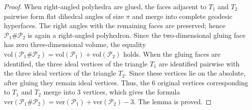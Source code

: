 \documentclass[10pt,a4paper]{amsart}
\newcommand{\ver}{\mathrm{ver}}
\newcommand{\vol}{\mathrm{vol}}
\begin{document}
	\begin{proof}
			When right-angled polyhedra are glued, the faces adjacent to $T_1$ and $T_2$ pairwise form flat dihedral angles of size $\pi$ and merge into complete geodesic hyperfaces. The right angles with the remaining faces are preserved; hence $\mathcal P_1 \# \mathcal P_2$ is again a right-angled polyhedron.
			Since the two-dimensional gluing face has zero three-dimensional volume, the equality $\vol(\mathcal P_1 \# \mathcal P_2) = \vol(\mathcal P_1) + \vol(\mathcal P_2)$ holds. When the gluing faces are identified, the three ideal vertices of the triangle $T_1$ are identified pairwise with the three ideal vertices of the triangle $T_2$. Since these vertices lie on the absolute, after gluing they remain ideal vertices. Thus, the $6$ original vertices corresponding to $T_1$ and $T_2$ merge into $3$ vertices, which gives the formula $\ver(\mathcal P_1 \# \mathcal P_2) = \ver(\mathcal P_1) + \ver(\mathcal P_2) - 3$. The lemma is proved.
	\end{proof}
\end{document}
